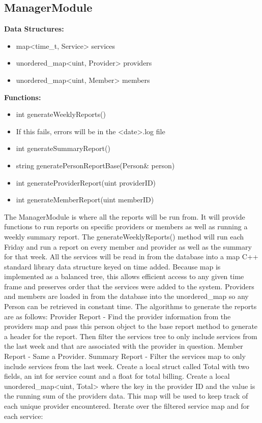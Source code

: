 \documentclass{article}
\begin{document}
\subsection{ManagerModule}
\textbf{Data Structures:}
\begin{itemize}
   \item map<time_t, Service>  services
   \item unordered_map<uint, Provider> providers
   \item unordered_map<uint, Member> members
\end{itemize}
\textbf{Functions:}
\begin{itemize}
   \item int generateWeeklyReports()
   \item If this fails, errors will be in the <date>.log file
   \item int generateSummaryReport()
   \item string generatePersonReportBase(Person\& person)
   \item int generateProviderReport(uint providerID)
   \item int generateMemberReport(uint memberID)
\end{itemize}
The ManagerModule is where all the reports will be run from. It will provide functions to run reports on specific providers or members as well as running a weekly summary report. The generateWeeklyReports() method will run each Friday and run a report on every member and provider as well as the summary for that week. All the services will be read in from the database into a map C++ standard library data structure keyed on time added. Because map is implemented as a balanced tree, this allows efficient access to any given time frame and preserves order that the services were added to the system. Providers and members are loaded in from the database into the unordered_map so any Person can be retrieved in constant time. The algorithms to generate the reports are as follows:
Provider Report - Find the provider information from the providers map and pass this person object to the base report method to generate a header for the report. Then filter the services tree to only include services from the last week and that are associated with the provider in question.
Member Report - Same a Provider.
Summary Report - Filter the services map to only include services from the last week. Create a local struct called Total with two fields, an int for service count and a float for total billing. Create a local unordered_map<uint, Total> where the key in the provider ID and the value is the running sum of the providers data. This map will be used to keep track of each unique provider encountered. Iterate over the filtered service map and for each service:
\end{document}
